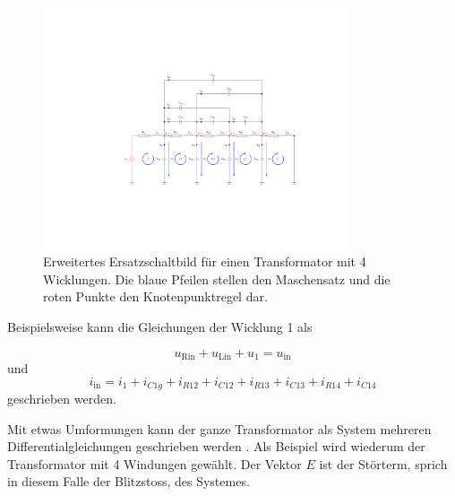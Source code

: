 \begin{refsection}
\begin{figure}
	\centering
	\includegraphics[width=0.8\textwidth]{trafo/orig_trafo.pdf}
	\caption[Erweitertes Ersatzschaltbild für einen Transformator mit Maschensatz und Knotenpunkt]{Erweitertes Ersatzschaltbild für einen Transformator mit 4 Wicklungen. Die blaue Pfeilen stellen den Maschensatz und die roten Punkte den Knotenpunktregel dar.}
	\label{trafo:orig}
\end{figure}

Beispielsweise kann die Gleichungen der Wicklung 1 als 

\begin{equation*}
	u_\mathrm{Rin} + u_\mathrm{Lin} + u_1 = u_\mathrm{in}
\end{equation*}
und 
\begin{equation}
	i_\mathrm{in} = i_1 + i_{C1g} + i_{R12} + i_{C12} + i_{R13} + i_{C13} + i_{R14} + i_{C14}
\end{equation}
geschrieben werden. 

Mit etwas Umformungen kann der ganze Transformator als System mehreren Differentialgleichungen geschrieben werden \cite{trafo:SeminarCHR}. Als Beispiel wird wiederum der Transformator mit 4 Windungen gewählt. Der Vektor $E$ ist der Störterm, sprich in diesem Falle der Blitzstoss, des Systemes.


\end{refsection}
